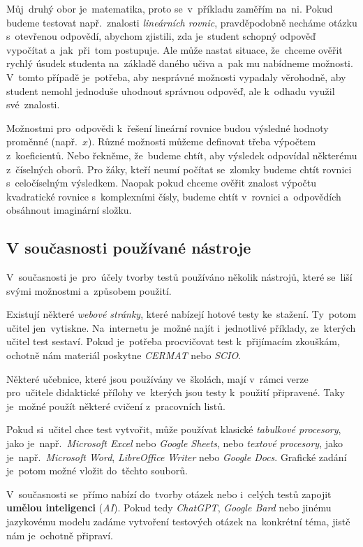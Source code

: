 \documentclass[10pt,a4paper]{article}
\begin{document}
        Můj~druhý obor je~matematika, proto se~v~příkladu zaměřím na~ni. Pokud budeme testovat např.~znalosti \emph{lineárních rovnic}, pravděpodobně necháme otázku s~otevřenou odpovědí, abychom zjistili, zda je~student schopný odpověď vypočítat a~jak~při~tom postupuje. Ale může nastat situace, že~chceme ověřit rychlý úsudek studenta na~základě daného učiva a~pak mu nabídneme možnosti. V~tomto případě je~potřeba, aby nesprávné možnosti vypadaly věrohodně, aby student nemohl jednoduše uhodnout správnou odpověď, ale k~odhadu využil své~znalosti.

        Možnostmi pro~odpovědi k~řešení lineární rovnice budou výsledné hodnoty proměnné (např.~$x$). Různé možnosti můžeme definovat třeba výpočtem z~koeficientů. Nebo řekněme, že~budeme chtít, aby výsledek odpovídal některému z~číselných oborů. Pro žáky, kteří neumí počítat se~zlomky budeme chtít rovnici s~celočíselným výsledkem. Naopak pokud chceme ověřit znalost výpočtu kvadratické rovnice s~komplexními čísly, budeme chtít v~rovnici a~odpovědích obsáhnout imaginární složku. \cite{zhouf:tvorbamatproblemu}

        \subsection{V současnosti používané nástroje}
        V~současnosti je~pro~účely tvorby testů používáno několik nástrojů, které se~liší svými možnostmi a~způsobem použití.
        
        Existují některé \emph{webové stránky}, které nabízejí hotové testy ke~stažení. 
        Ty~potom učitel jen~vytiskne. Na~internetu je~možné najít i~jednotlivé příklady, ze~kterých učitel test sestaví. Pokud je~potřeba procvičovat test k~přijímacím zkouškám, ochotně nám materiál poskytne \emph{CERMAT} nebo \emph{SCIO}.

        Některé učebnice, které jsou používány ve~školách, mají v~rámci verze pro~učitele didaktické přílohy ve~kterých jsou testy k~použití připravené. Taky je~možné použít některé cvičení z~pracovních listů.

        Pokud si~učitel chce test vytvořit, může používat klasické \emph{tabulkové procesory}, jako je~např.~\emph{Microsoft Excel} nebo \emph{Google Sheets}, nebo \emph{textové procesory}, jako je~např.~\emph{Microsoft Word}, \emph{LibreOffice Writer} nebo \emph{Google Docs}. Grafické zadání je~potom možné vložit do~těchto souborů.

        V~současnosti se~přímo nabízí do~tvorby otázek nebo i~celých testů zapojit \textbf{umělou inteligenci} (\emph{AI}). Pokud tedy \emph{ChatGPT}, \emph{Google Bard} nebo jinému jazykovému modelu zadáme vytvoření testových otázek na~konkrétní téma, jistě nám je~ochotně připraví.
\end{document}
